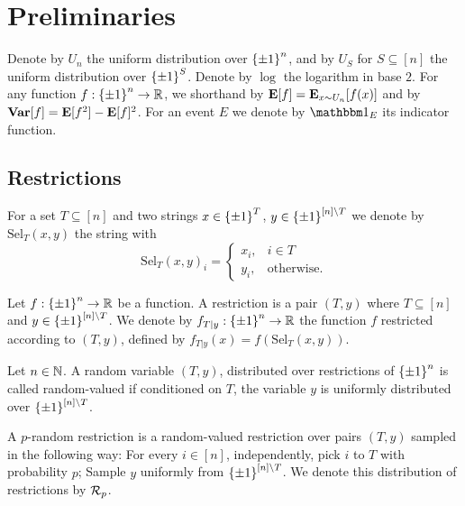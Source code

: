 \newcommand{\Sel}{\mathrm{Sel}}
\section{Preliminaries}

Denote by $U_n$ the uniform distribution over ${\{\pm1\}}^n$, and by $U_S$ for $S\subseteq [n]$ the uniform distribution over ${\{\pm1\}}^S$. 
Denote by $\log$ the logarithm in base $2$. For any function $f: {\{\pm1\}}^n \to {\mathbb{R}}$, we shorthand by $\mathop{\bf E\/}[f] = \mathop{\bf E\/}_{x\sim U_n}[f(x)]$ and by  $\mathop{\bf Var\/}[f] = \mathop{\bf E\/}[f^2]-\mathop{\bf E\/}[f]^2$.
For an event $E$ we denote by $\one_{E}$ its indicator function.
\subsection{Restrictions}
For a set $T \subseteq [n]$ and two strings $x \in {\{\pm1\}}^T$, $y\in {\{\pm1\}}^{[n]\setminus T}$ we denote 
by $\Sel_T(x,y)$ the string with $$\Sel_T(x,y)_i = \begin{cases}x_i,& i\in T\\ y_i, &\text{otherwise.}\end{cases}$$
\begin{definition}[Restriction]\label{def:restriction}
  Let $f:{\{\pm1\}}^n\to{\mathbb{R}}$ be a  function. A {\sf restriction} is a pair $(T,y)$ where $T \subseteq [n]$ and $y \in {\{\pm1\}}^{[n]\setminus T}$. We denote by $f_{T|y}:{\{\pm1\}}^n \to {\mathbb{R}}$ the function $f$ restricted according to $(T,y)$, defined by $f_{T|y}(x) = f(\Sel_T(x,y))$.
\end{definition}


\begin{definition}\label{def:random_valued_restriction}
Let $n \in {\mathbb{N}}$.
A random variable $(T,y)$, distributed over restrictions of ${\{\pm1\}}^n$ is called {\sf random-valued} if conditioned on $T$, the variable $y$ is uniformly distributed over ${\{\pm1\}}^{[n]\setminus T}$.
\end{definition}


\begin{definition}\label{def:p_random_restriction}
  A {\sf $p$-random restriction} is a random-valued restriction over pairs $(T,y)$ sampled in the following way: For every $i\in[n]$, independently, pick $i$ to $T$ with
  probability $p$;  
  Sample $y$ uniformly from ${\{\pm1\}}^{[n]\setminus T}$.
  We denote this distribution of restrictions by $\mathcal{R}_p$.
\end{definition}

